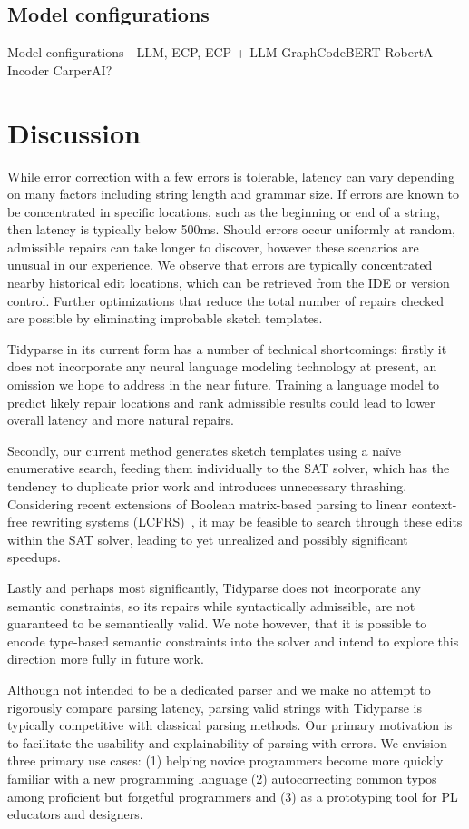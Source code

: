 \documentclass[sigplan,review,anonymous,acmsmall]{acmart}\settopmatter{printfolios=false,printccs=false,printacmref=false}
\begin{document}
\subsection{Model configurations}
Model configurations - LLM, ECP, ECP + LLM
GraphCodeBERT
RobertA
Incoder
CarperAI?

\section{Discussion}

While error correction with a few errors is tolerable, latency can vary depending on many factors including string length and grammar size. If errors are known to be concentrated in specific locations, such as the beginning or end of a string, then latency is typically below 500ms. Should errors occur uniformly at random, admissible repairs can take longer to discover, however these scenarios are unusual in our experience. We observe that errors are typically concentrated nearby historical edit locations, which can be retrieved from the IDE or version control. Further optimizations that reduce the total number of repairs checked are possible by eliminating improbable sketch templates.

Tidyparse in its current form has a number of technical shortcomings: firstly it does not incorporate any neural language modeling technology at present, an omission we hope to address in the near future. Training a language model to predict likely repair locations and rank admissible results could lead to lower overall latency and more natural repairs.

Secondly, our current method generates sketch templates using a na\"ive enumerative search, feeding them individually to the SAT solver, which has the tendency to duplicate prior work and introduces unnecessary thrashing. Considering recent extensions of Boolean matrix-based parsing to linear context-free rewriting systems (LCFRS)~\cite{cohen2016parsing}, it may be feasible to search through these edits within the SAT solver, leading to yet unrealized and possibly significant speedups.

Lastly and perhaps most significantly, Tidyparse does not incorporate any semantic constraints, so its repairs while syntactically admissible, are not guaranteed to be semantically valid. We note however, that it is possible to encode type-based semantic constraints into the solver and intend to explore this direction more fully in future work.

Although not intended to be a dedicated parser and we make no attempt to rigorously compare parsing latency, parsing valid strings with Tidyparse is typically competitive with classical parsing methods. Our primary motivation is to facilitate the usability and explainability of parsing with errors. We envision three primary use cases: (1) helping novice programmers become more quickly familiar with a new programming language (2) autocorrecting common typos among proficient but forgetful programmers and (3) as a prototyping tool for PL educators and designers.
\end{document}
